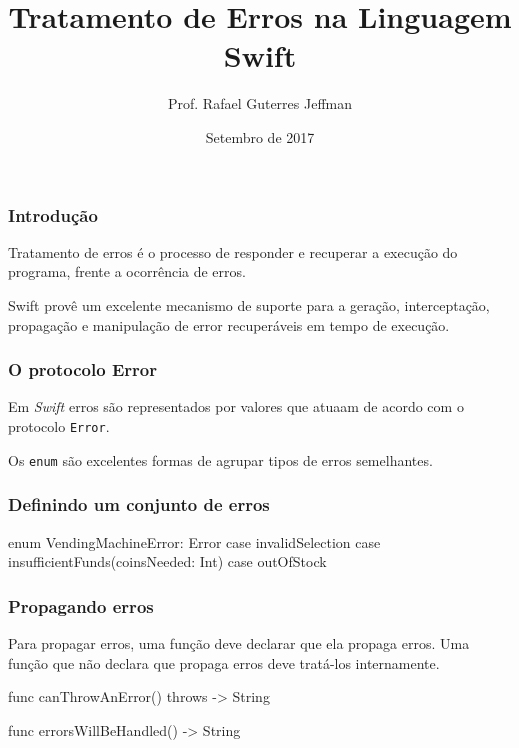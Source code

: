 



\title{Tratamento de Erros na Linguagem Swift}
\author{Prof. Rafael Guterres Jeffman}
\date{Setembro de 2017}



\coverframe

\begin{frame}
    \frametitle{Introdução}

    Tratamento de erros é o processo de responder e recuperar a execução
    do programa, frente a ocorrência de erros.

    \vspace{.7cm}

    Swift provê um excelente mecanismo de suporte para a geração,
    interceptação, propagação e manipulação de error recuperáveis em
    tempo de execução.
\end{frame}

\begin{frame}
    \frametitle{O protocolo Error}

    Em \textit{Swift} erros são representados por valores que atuaam de
    acordo com o protocolo \texttt{Error}.

    \vspace{.7cm}

    Os {\color{green}\texttt{enum}} são excelentes formas de agrupar
    tipos de erros semelhantes.
\end{frame}

\begin{frame}[fragile]
    \frametitle{Definindo um conjunto de erros}

    \begin{swift}
    enum VendingMachineError: Error {
        case invalidSelection
        case insufficientFunds(coinsNeeded: Int)
        case outOfStock
    }
    \end{swift}

\end{frame}

\begin{frame}[fragile]
    \frametitle{Propagando erros}
    Para propagar erros, uma função deve declarar que ela propaga erros.
    \vspace{.7cm}
    Uma função que não declara que propaga erros deve tratá-los
    internamente.

    \begin{swift}
        func canThrowAnError() throws -> String

        func errorsWillBeHandled() -> String
    \end{swift}

\end{frame}

